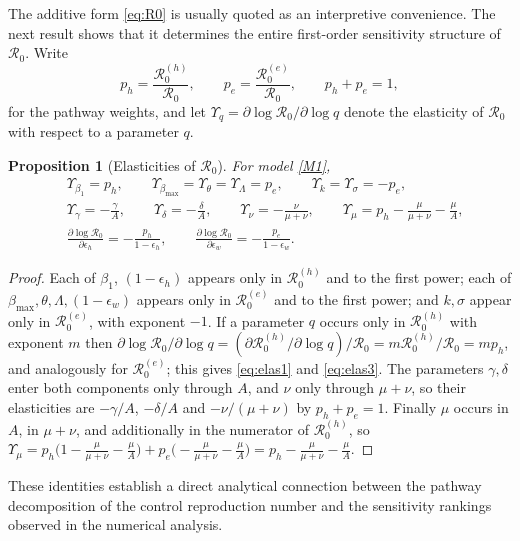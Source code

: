 \documentclass[11pt]{article}
\theoremstyle{plain}
\newtheorem{proposition}[theorem]{Proposition}
\theoremstyle{definition}
\theoremstyle{remark}
\newcommand{\Rz}{\mathcal{R}_0}
\newcommand{\Rzh}{\mathcal{R}_0^{(h)}}
\newcommand{\Rze}{\mathcal{R}_0^{(e)}}
\begin{document}
The additive form \eqref{eq:R0} is usually quoted as an interpretive convenience. The next result shows that it determines the entire first-order sensitivity structure of $\Rz$. Write
\begin{equation}\label{eq:weights}
p_h=\frac{\Rzh}{\Rz},\qquad p_e=\frac{\Rze}{\Rz},\qquad p_h+p_e=1,
\end{equation}
for the pathway weights, and let $\Upsilon_q=\partial\log\Rz/\partial\log q$ denote the elasticity of $\Rz$ with respect to a parameter $q$.

\begin{proposition}[Elasticities of $\Rz$]\label{prop:elasticity}
For model \eqref{M1},
\begin{align}
&\Upsilon_{\beta_1}=p_h,\qquad
\Upsilon_{\beta_{\max}}=\Upsilon_{\theta}=\Upsilon_{\Lambda}=p_e,\qquad
\Upsilon_{k}=\Upsilon_{\sigma}=-p_e,\label{eq:elas1}\\[2pt]
&\Upsilon_{\gamma}=-\frac{\gamma}{A},\qquad
\Upsilon_{\delta}=-\frac{\delta}{A},\qquad
\Upsilon_{\nu}=-\frac{\nu}{\mu+\nu},\qquad
\Upsilon_{\mu}=p_h-\frac{\mu}{\mu+\nu}-\frac{\mu}{A},\label{eq:elas2}\\[2pt]
&\frac{\partial\log\Rz}{\partial\epsilon_h}=-\frac{p_h}{1-\epsilon_h},\qquad
\frac{\partial\log\Rz}{\partial\epsilon_w}=-\frac{p_e}{1-\epsilon_w}.\label{eq:elas3}
\end{align}
\end{proposition}

\begin{proof}
Each of $\beta_1$, $(1-\epsilon_h)$ appears only in $\Rzh$ and to the first power; each of $\beta_{\max},\theta,\Lambda,(1-\epsilon_w)$ appears only in $\Rze$ and to the first power; and $k,\sigma$ appear only in $\Rze$, with exponent $-1$. If a parameter $q$ occurs only in $\Rzh$ with exponent $m$ then $\partial\log\Rz/\partial\log q=(\partial\Rzh/\partial\log q)/\Rz=m\Rzh/\Rz=mp_h$, and analogously for $\Rze$; this gives \eqref{eq:elas1} and \eqref{eq:elas3}. The parameters $\gamma,\delta$ enter both components only through $A$, and $\nu$ only through $\mu+\nu$, so their elasticities are $-\gamma/A$, $-\delta/A$ and $-\nu/(\mu+\nu)$ by $p_h+p_e=1$. Finally $\mu$ occurs in $A$, in $\mu+\nu$, and additionally in the numerator of $\Rzh$, so
$\Upsilon_\mu=p_h\big(1-\tfrac{\mu}{\mu+\nu}-\tfrac{\mu}{A}\big)+p_e\big(-\tfrac{\mu}{\mu+\nu}-\tfrac{\mu}{A}\big)=p_h-\tfrac{\mu}{\mu+\nu}-\tfrac{\mu}{A}$.
\end{proof}
These identities establish a direct analytical connection between the pathway decomposition of the control reproduction number and the sensitivity rankings observed in the numerical analysis.
\end{document}
